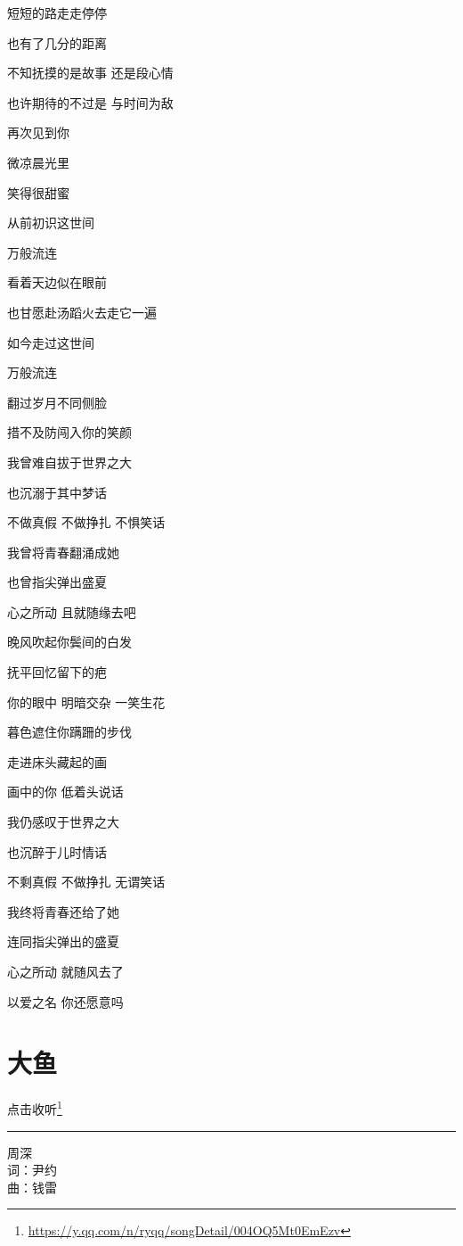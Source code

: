 \documentclass[]{ctexbook}
\renewcommand{\href}[2]{#2\footnote{\url{#1}}}
\begin{document}
短短的路走走停停

也有了几分的距离

不知抚摸的是故事 还是段心情

也许期待的不过是 与时间为敌

再次见到你

微凉晨光里

笑得很甜蜜

从前初识这世间

万般流连

看着天边似在眼前

也甘愿赴汤蹈火去走它一遍

如今走过这世间

万般流连

翻过岁月不同侧脸

措不及防闯入你的笑颜

我曾难自拔于世界之大

也沉溺于其中梦话

不做真假 不做挣扎 不惧笑话

我曾将青春翻涌成她

也曾指尖弹出盛夏

心之所动 且就随缘去吧

晚风吹起你鬓间的白发

抚平回忆留下的疤

你的眼中 明暗交杂 一笑生花

暮色遮住你蹒跚的步伐

走进床头藏起的画

画中的你 低着头说话

我仍感叹于世界之大

也沉醉于儿时情话

不剩真假 不做挣扎 无谓笑话

我终将青春还给了她

连同指尖弹出的盛夏

心之所动 就随风去了

以爱之名 你还愿意吗

\section*{大鱼}\label{big-fish}


\href{https://y.qq.com/n/ryqq/songDetail/004OQ5Mt0EmEzv}{点击收听}

\begin{center}\rule{0.5\linewidth}{0.5pt}\end{center}

周深\\
词：尹约\\
曲：钱雷
\end{document}
